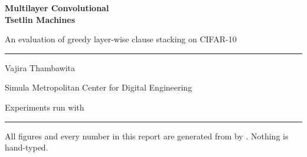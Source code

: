 \documentclass[11pt,a4paper]{article}
\begin{document}
\begin{titlepage}
\vspace*{18mm}
{\sffamily\bfseries\color{ttdeep}\Huge Multilayer Convolutional\\[2mm] Tsetlin Machines\par}
\vspace{6mm}
{\sffamily\LARGE\color{ttorange} An evaluation of greedy layer-wise clause stacking on CIFAR-10\par}
\vspace{10mm}
{\color{ttrule}\rule{\textwidth}{1.1pt}}
\vspace{6mm}

{\sffamily\large Vajira Thambawita\par}
{\sffamily\color{ttgray} Simula Metropolitan Center for Digital Engineering\par}
\vspace{3mm}
{\sffamily\color{ttgray} Experiments run with \ttlibname\ \ttversionreport\par}
\vspace{14mm}

\begin{ttcallout}[Summary]

\end{ttcallout}

\vfill
{\color{ttrule}\rule{\textwidth}{0.6pt}}
{\sffamily\footnotesize\color{ttgray} All figures and every number in this report are generated
from  by . Nothing is hand-typed.\par}
\end{titlepage}

{\sffamily\footnotesize
 \setlength{\parskip}{0pt}
 \renewcommand{\contentsname}{\textcolor{ttdeep}{Contents}}
 \tableofcontents}
\clearpage
{}









\end{document}
